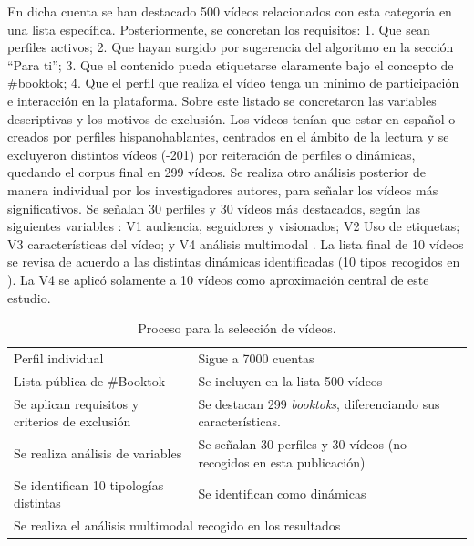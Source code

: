 En dicha cuenta se han destacado 500 vídeos relacionados con esta
categoría en una lista específica. Posteriormente, se concretan los
requisitos: 1. Que sean perfiles activos; 2. Que hayan surgido por
sugerencia del algoritmo en la sección ``Para ti''; 3. Que el contenido
pueda etiquetarse claramente bajo el concepto de \#booktok; 4. Que el
perfil que realiza el vídeo tenga un mínimo de participación e
interacción en la plataforma. Sobre este listado se concretaron las
variables descriptivas \cite{braun2006} y los motivos de exclusión.
Los vídeos tenían que estar en español o creados por perfiles
hispanohablantes, centrados en el ámbito de la lectura y se excluyeron
distintos vídeos (-201) por reiteración de perfiles o dinámicas,
quedando el corpus final en 299 vídeos. Se realiza otro análisis
posterior de manera individual por los investigadores autores, para
señalar los vídeos más significativos. Se señalan 30 perfiles y 30
vídeos más destacados, según las siguientes variables \cite{desantis2000}: V1 audiencia, seguidores y visionados; V2 Uso de
etiquetas; V3 características del vídeo; y V4 análisis multimodal
\cite{kress2001}. La lista final de 10 vídeos se revisa de
acuerdo a las distintas dinámicas identificadas (10 tipos recogidos en
). La V4 se aplicó solamente a 10 vídeos como aproximación
central de este estudio.

\begin{table}[htpb]
\centering
\begin{threeparttable}
\caption{Proceso para la selección de vídeos.}
\label{tab-01}
\begin{tabular}{p{}p{}}
\toprule
Perfil individual & Sigue a 7000 cuentas \\
Lista pública de \#Booktok & Se incluyen en la lista 500 vídeos \\
Se aplican requisitos y criterios de exclusión & Se destacan 299
\emph{booktoks}, diferenciando sus características. \\
Se realiza análisis de variables & Se señalan 30 perfiles y 30 vídeos
(no recogidos en esta publicación) \\
Se identifican 10 tipologías distintas & Se identifican como
dinámicas \\
\multicolumn{2}{l}{Se realiza el análisis multimodal recogido en los resultados} \\
\bottomrule
\end{tabular}
\end{threeparttable}
\end{table}


